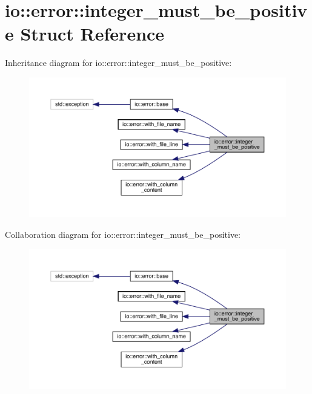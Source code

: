 \hypertarget{structio_1_1error_1_1integer__must__be__positive}{}\section{io\+:\+:error\+:\+:integer\+\_\+must\+\_\+be\+\_\+positive Struct Reference}
\label{structio_1_1error_1_1integer__must__be__positive}


Inheritance diagram for io\+:\+:error\+:\+:integer\+\_\+must\+\_\+be\+\_\+positive\+:
\nopagebreak
\begin{figure}[H]
\begin{center}
\leavevmode
\includegraphics[width=350pt]{structio_1_1error_1_1integer__must__be__positive__inherit__graph}
\end{center}
\end{figure}


Collaboration diagram for io\+:\+:error\+:\+:integer\+\_\+must\+\_\+be\+\_\+positive\+:
\nopagebreak
\begin{figure}[H]
\begin{center}
\leavevmode
\includegraphics[width=350pt]{structio_1_1error_1_1integer__must__be__positive__coll__graph}
\end{center}
\end{figure}
